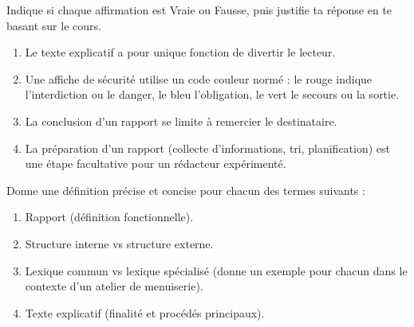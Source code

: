 \documentclass[11pt]{article}
\begin{document}
\begin{exercice}
Indique si chaque affirmation est Vraie ou Fausse, puis justifie ta réponse en te basant sur le cours.
\begin{enumerate}
    \item Le texte explicatif a pour unique fonction de divertir le lecteur.
    \item Une affiche de sécurité utilise un code couleur normé : le rouge indique l'interdiction ou le danger, le bleu l'obligation, le vert le secours ou la sortie.
    \item La conclusion d'un rapport se limite à remercier le destinataire.
    \item La préparation d'un rapport (collecte d'informations, tri, planification) est une étape facultative pour un rédacteur expérimenté.
\end{enumerate}
\end{exercice}

\begin{exercice}
Donne une définition précise et concise pour chacun des termes suivants :
\begin{enumerate}
    \item Rapport (définition fonctionnelle).
    \item Structure interne vs structure externe.
    \item Lexique commun vs lexique spécialisé (donne un exemple pour chacun dans le contexte d'un atelier de menuiserie).
    \item Texte explicatif (finalité et procédés principaux).
\end{enumerate}
\end{exercice}
\end{document}
